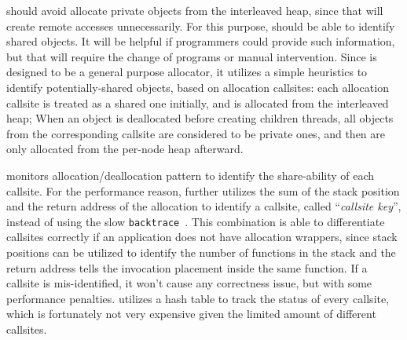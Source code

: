 \NA{} should avoid allocate private objects from the interleaved heap, since that will create remote accesses unnecessarily. For this purpose, \NM{} should be able to identify shared objects. It will be helpful if programmers could provide such information, but that will require the change of programs or manual intervention. Since \NM{} is designed to be a general purpose allocator, it utilizes a simple heuristics to identify potentially-shared objects, based on allocation callsites: each allocation callsite is treated as a shared one initially, and is allocated from the interleaved heap; When an object is deallocated before creating children threads, all objects from the corresponding callsite are considered to be private ones, and then are only allocated from the per-node heap afterward. 

 \NM{} monitors allocation/deallocation pattern to identify the share-ability of each callsite. For the performance reason, \NA{} further utilizes the sum of the stack position and the return address of the allocation to identify a callsite, called ``\textit{callsite key}'', instead of using the slow \texttt{backtrace}~\cite{DBLP:conf/icse/SumnerZWZ10, DBLP:conf/cgo/ZengR0AJ014}. This combination is able to differentiate callsites correctly if an application does not have allocation wrappers, since stack positions can be utilized to identify the number of functions in the stack and the return address tells the invocation placement inside the same function. If a callsite is mis-identified, it won't cause any correctness issue, but with some performance penalties. \NA{} utilizes a hash table to track the status of every callsite, which is fortunately not very expensive given the limited amount of different callsites. 
 

